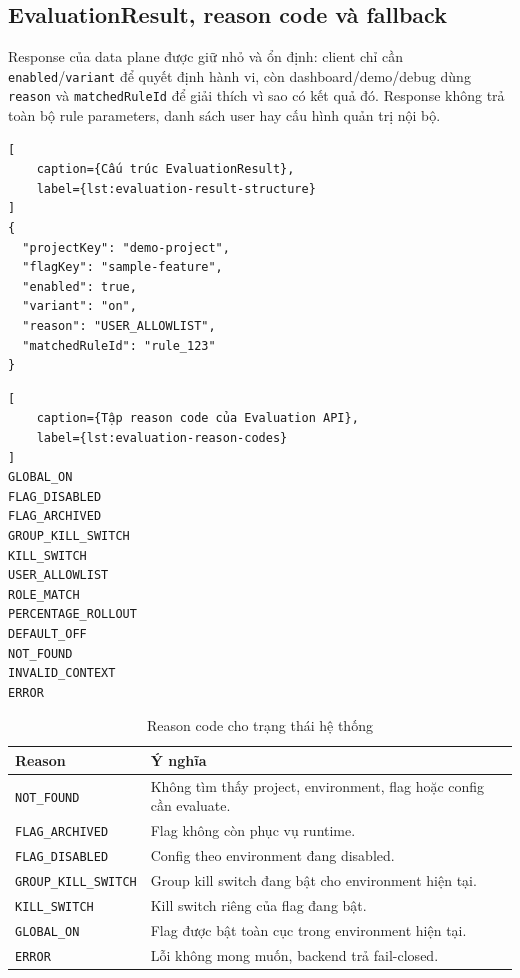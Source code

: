 \subsection{EvaluationResult, reason code và fallback}

Response của data plane được giữ nhỏ và ổn định: client chỉ cần \texttt{enabled}/\texttt{variant} để quyết định hành vi, còn dashboard/demo/debug dùng \texttt{reason} và \texttt{matchedRuleId} để giải thích vì sao có kết quả đó. Response không trả toàn bộ rule parameters, danh sách user hay cấu hình quản trị nội bộ.

\begin{lstlisting}[
    caption={Cấu trúc EvaluationResult},
    label={lst:evaluation-result-structure}
]
{
  "projectKey": "demo-project",
  "flagKey": "sample-feature",
  "enabled": true,
  "variant": "on",
  "reason": "USER_ALLOWLIST",
  "matchedRuleId": "rule_123"
}
\end{lstlisting}

\begin{lstlisting}[
    caption={Tập reason code của Evaluation API},
    label={lst:evaluation-reason-codes}
]
GLOBAL_ON
FLAG_DISABLED
FLAG_ARCHIVED
GROUP_KILL_SWITCH
KILL_SWITCH
USER_ALLOWLIST
ROLE_MATCH
PERCENTAGE_ROLLOUT
DEFAULT_OFF
NOT_FOUND
INVALID_CONTEXT
ERROR
\end{lstlisting}

\begin{table}[H]
    \centering
    \caption{Reason code cho trạng thái hệ thống}
    \label{tab:system-reason-codes}
    \begin{tabular}{p{} p{}}
        \toprule
        \textbf{Reason} & \textbf{Ý nghĩa} \\
        \midrule
        \texttt{NOT\_FOUND} & Không tìm thấy project, environment, flag hoặc config cần evaluate. \\
        \texttt{FLAG\_ARCHIVED} & Flag không còn phục vụ runtime. \\
        \texttt{FLAG\_DISABLED} & Config theo environment đang disabled. \\
        \texttt{GROUP\_KILL\_SWITCH} & Group kill switch đang bật cho environment hiện tại. \\
        \texttt{KILL\_SWITCH} & Kill switch riêng của flag đang bật. \\
        \texttt{GLOBAL\_ON} & Flag được bật toàn cục trong environment hiện tại. \\
        \texttt{ERROR} & Lỗi không mong muốn, backend trả fail-closed. \\
        \bottomrule
    \end{tabular}
\end{table}

